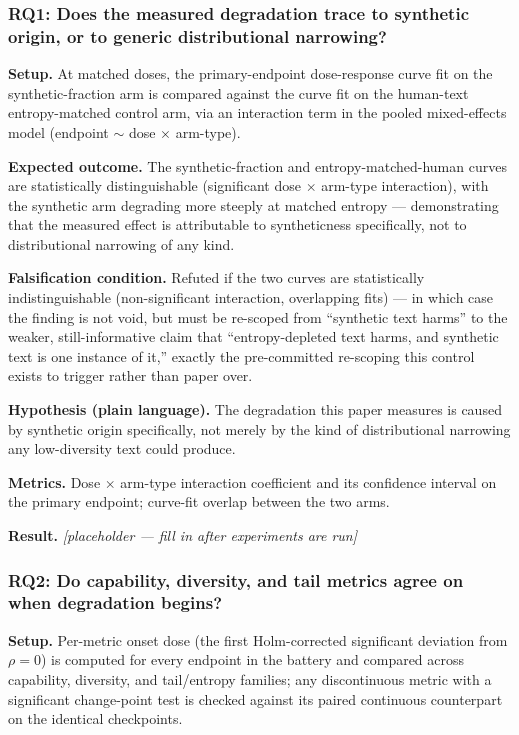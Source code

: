 \documentclass[11pt]{article}
\newcommand{\ph}{\textit{[placeholder --- fill in after experiments are run]}}
\begin{document}
\subsubsection{RQ1: Does the measured degradation trace to synthetic origin, or to generic distributional narrowing?}
\textbf{Setup.} At matched doses, the primary-endpoint dose-response curve fit on the synthetic-fraction arm is compared against the curve fit on the human-text entropy-matched control arm, via an interaction term in the pooled mixed-effects model (endpoint $\sim$ dose $\times$ arm-type).

\textbf{Expected outcome.} The synthetic-fraction and entropy-matched-human curves are statistically distinguishable (significant dose $\times$ arm-type interaction), with the synthetic arm degrading more steeply at matched entropy --- demonstrating that the measured effect is attributable to syntheticness specifically, not to distributional narrowing of any kind.

\textbf{Falsification condition.} Refuted if the two curves are statistically indistinguishable (non-significant interaction, overlapping fits) --- in which case the finding is not void, but must be re-scoped from ``synthetic text harms'' to the weaker, still-informative claim that ``entropy-depleted text harms, and synthetic text is one instance of it,'' exactly the pre-committed re-scoping this control exists to trigger rather than paper over.

\textbf{Hypothesis (plain language).} The degradation this paper measures is caused by synthetic origin specifically, not merely by the kind of distributional narrowing any low-diversity text could produce.

\textbf{Metrics.} Dose $\times$ arm-type interaction coefficient and its confidence interval on the primary endpoint; curve-fit overlap between the two arms.

\textbf{Result.} \ph

\subsubsection{RQ2: Do capability, diversity, and tail metrics agree on when degradation begins?}
\textbf{Setup.} Per-metric onset dose (the first Holm-corrected significant deviation from $\rho = 0$) is computed for every endpoint in the battery and compared across capability, diversity, and tail/entropy families; any discontinuous metric with a significant change-point test is checked against its paired continuous counterpart on the identical checkpoints.
\end{document}
